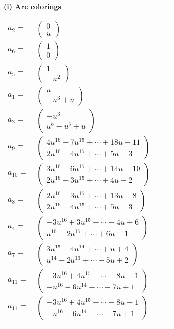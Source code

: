 \documentclass[1p]{elsarticle_modified}
\theoremstyle{definition}
\begin{document}
\flushleft \textbf{(i) Arc colorings}\\
\begin{tabular}{m{7pt} m{180pt} m{7pt} m{180pt} }
\flushright $a_{2}=$&$\begin{pmatrix}0\\u\end{pmatrix}$ \\
\flushright $a_{6}=$&$\begin{pmatrix}1\\0\end{pmatrix}$ \\
\flushright $a_{5}=$&$\begin{pmatrix}1\\- u^2\end{pmatrix}$ \\
\flushright $a_{1}=$&$\begin{pmatrix}u\\- u^3+u\end{pmatrix}$ \\
\flushright $a_{3}=$&$\begin{pmatrix}- u^3\\u^5- u^3+u\end{pmatrix}$ \\
\flushright $a_{9}=$&$\begin{pmatrix}4 u^{16}-7 u^{15}+\cdots+18 u-11\\2 u^{16}-4 u^{15}+\cdots+5 u-3\end{pmatrix}$ \\
\flushright $a_{10}=$&$\begin{pmatrix}3 u^{16}-6 u^{15}+\cdots+14 u-10\\2 u^{16}-3 u^{15}+\cdots+4 u-2\end{pmatrix}$ \\
\flushright $a_{8}=$&$\begin{pmatrix}2 u^{16}-3 u^{15}+\cdots+13 u-8\\2 u^{16}-4 u^{15}+\cdots+5 u-3\end{pmatrix}$ \\
\flushright $a_{4}=$&$\begin{pmatrix}-3 u^{16}+3 u^{15}+\cdots-4 u+6\\u^{16}-2 u^{15}+\cdots+6 u-1\end{pmatrix}$ \\
\flushright $a_{7}=$&$\begin{pmatrix}3 u^{15}-4 u^{14}+\cdots+u+4\\u^{14}-2 u^{13}+\cdots-5 u+2\end{pmatrix}$ \\
\flushright $a_{11}=$&$\begin{pmatrix}-3 u^{16}+4 u^{15}+\cdots-8 u-1\\- u^{16}+6 u^{14}+\cdots-7 u+1\end{pmatrix}$\\ \flushright $a_{11}=$&$\begin{pmatrix}-3 u^{16}+4 u^{15}+\cdots-8 u-1\\- u^{16}+6 u^{14}+\cdots-7 u+1\end{pmatrix}$\\&\end{tabular}
\end{document}
